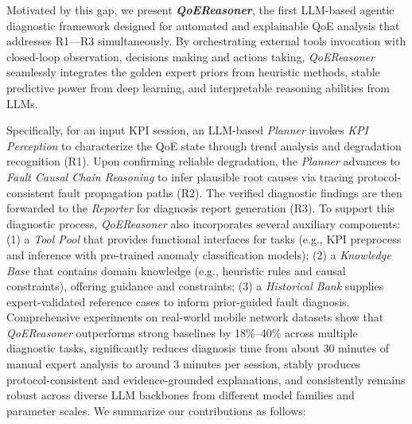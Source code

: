 \documentclass[sigconf,10pt]{acmart} %
\begin{document}
Motivated by this gap, we present \textit{\textbf{QoEReasoner}}, the first LLM-based agentic diagnostic framework designed for automated and explainable QoE analysis that addresses R1---R3 simultaneously.
By orchestrating external tools invocation with closed-loop observation, decisions making and actions taking, \textit{{QoEReasoner}} seamlessly integrates the golden expert priors from heuristic methods, stable predictive power from deep learning, and interpretable reasoning abilities from LLMs. 


Specifically, for an input KPI session, an LLM-based \emph{Planner} invokes \emph{KPI Perception} to characterize the QoE state through trend analysis and degradation recognition (R1). Upon confirming reliable degradation, the \emph{Planner} advances to \emph{Fault Causal Chain Reasoning} to infer plausible root causes via tracing protocol-consistent fault propagation paths (R2). The verified diagnostic findings are then forwarded to the \emph{Reporter} for diagnosis report generation (R3). To support this diagnostic process, \emph{QoEReasoner} also incorporates several auxiliary components: (1) a \emph{Tool Pool} that provides functional interfaces for tasks (e.g., KPI preprocess and inference with pre-trained anomaly classification models); (2) a \emph{Knowledge Base} that contains domain knowledge (e.g., heuristic rules and causal constraints), offering guidance and constraints; (3) a \emph{Historical Bank} supplies expert-validated reference cases to inform prior-guided fault diagnosis. Comprehensive experiments on real-world mobile network datasets show that \textit{QoEReasoner} outperforms strong baselines by 18\%--40\% across multiple diagnostic tasks, significantly reduces diagnosis time from about 30 minutes of manual expert analysis to around 3 minutes per session, stably produces protocol-consistent and evidence-grounded explanations, and consistently remains robust across diverse LLM backbones from different model families and parameter scales. We summarize our contributions as follows:
\end{document}
